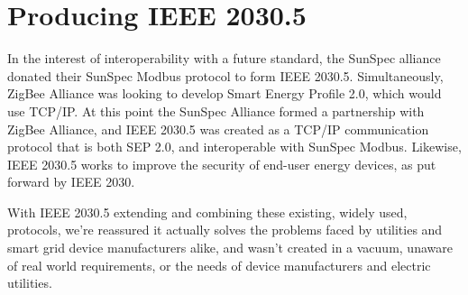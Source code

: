 \section{Producing IEEE 2030.5}

In the interest of interoperability with a future standard, the SunSpec alliance donated their SunSpec Modbus protocol to form IEEE 2030.5. Simultaneously, ZigBee Alliance was looking to develop Smart Energy Profile 2.0, which would use TCP/IP.
At this point the SunSpec Alliance formed a partnership with ZigBee Alliance, and IEEE 2030.5 was created as a TCP/IP communication protocol that is both SEP 2.0, and interoperable with SunSpec Modbus. \cite[]{SunspecModbusArticle}
Likewise, IEEE 2030.5 works to improve the security of end-user energy devices, as put forward by IEEE 2030. 

With IEEE 2030.5 extending and combining these existing, widely used, protocols, we're reassured it actually solves the problems faced by utilities and smart grid device manufacturers alike, and wasn't created in a vacuum, unaware of real world requirements, or the needs of device manufacturers and electric utilities.


